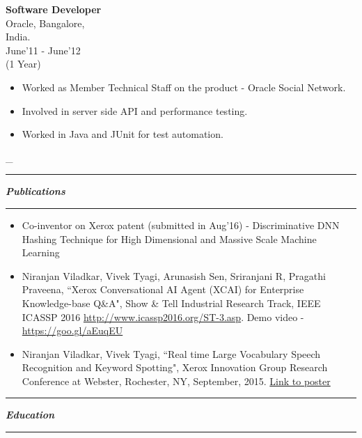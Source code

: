 \documentclass[10pt]{article}
\begin{document}
\parbox{90pt}{\raggedright
	{\bf Software Developer} \\
	Oracle, Bangalore,\\
	India.\\
	June'11 - June'12\\
	(1 Year)
}
\parbox{390pt}{
	\begin{itemize}
	\item Worked as Member Technical Staff on the product - Oracle Social Network.
	\item Involved in server side API and performance testing.
	\item Worked in Java and JUnit for test automation.
	\end{itemize}		
	
}

\pagebreak 
\_
\vspace{25pt}

\hrule
\vspace{3pt}
{\Large \bfseries \slshape \sc Publications}
\vspace{3pt}
\hrule
\begin{itemize}
\item Co-inventor on Xerox patent (submitted in Aug'16) - Discriminative DNN Hashing Technique for High Dimensional and Massive Scale Machine Learning 
\item Niranjan Viladkar, Vivek Tyagi, Arunasish Sen, Sriranjani R, Pragathi Praveena, ``Xerox Conversational AI Agent (XCAI) for Enterprise Knowledge-base Q\&A", Show \& Tell Industrial Research Track, IEEE ICASSP 2016 \url{http://www.icassp2016.org/ST-3.asp}. Demo video - \url{https://goo.gl/aEuqEU}
\item Niranjan Viladkar, Vivek Tyagi, ``Real time Large Vocabulary Speech Recognition and Keyword Spotting", Xerox Innovation Group Research Conference at Webster, Rochester, NY, September, 2015. \href{https://drive.google.com/open?id=0ByWGijDf3JffS2lrZmw0Mkdwc0U}{Link to poster} 
\end{itemize}

\hrule \vspace{3pt}
{\Large \bfseries \slshape \sc Education}
\vspace{3pt}\hrule\vspace{5pt}
\end{document}
